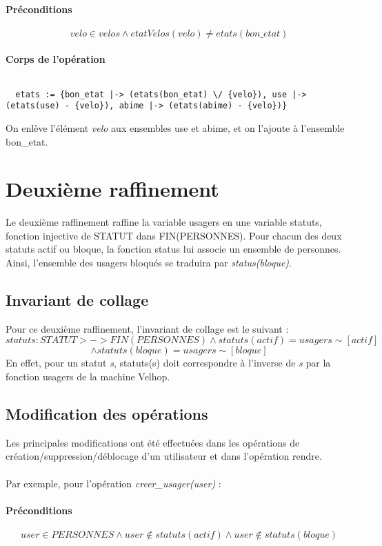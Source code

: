 \documentclass[12pt]{article}
\begin{document}
\paragraph{Préconditions}
\[ velo \in velos \land etatVelos(velo) \neq etats(bon\_etat) \]
\paragraph{Corps de l'opération}
\[\]
\begin{lstlisting}
  etats := {bon_etat |-> (etats(bon_etat) \/ {velo}), use |-> (etats(use) - {velo}), abime |-> (etats(abime) - {velo})}
\end{lstlisting}
On enlève l'élément \textit{velo} aux ensembles use et abime, et on l'ajoute à l'ensemble bon\_etat.
\newpage
\section{Deuxième raffinement}
Le deuxième raffinement raffine la variable usagers en une variable statuts, fonction injective de STATUT dans FIN(PERSONNES). Pour chacun des deux statuts actif ou bloque, la fonction status lui associe un ensemble de personnes. Ainsi, l'ensemble des usagers bloqués se traduira par \textit{status(bloque)}.
\subsection{Invariant de collage}
Pour ce deuxième raffinement, l'invariant de collage est le suivant : \\
\[ statuts : STATUT >-> FIN(PERSONNES) \land statuts(actif) = usagers\sim[{actif}] \]
\[ \land statuts(bloque) = usagers\sim[{bloque}] \]
En effet, pour un statut \textit{s}, statuts(s) doit correspondre à l'inverse de \textit{s} par la fonction usagers de la machine Velhop.
\subsection{Modification des opérations}
Les principales modifications ont été effectuées dans les opérations de création/suppression/déblocage d’un utilisateur et dans l’opération rendre. \\ \\
Par exemple, pour l'opération \textit{creer\_usager(user)} :
\paragraph{Préconditions}
\[user \in PERSONNES \land user \notin statuts(actif) \land user \notin statuts(bloque)\]
\end{document}
